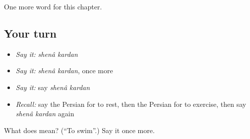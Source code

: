 \begin{grammarlens}[title={What you've built}]
One more word for this chapter.
\end{grammarlens}

\subsection*{Your turn}
\begin{itemize}
\raggedright
  \item \emph{Say it:} \emph{shenâ kardan}
  \item \emph{Say it:} \emph{shenâ kardan}, once more
  \item \emph{Say it:} say \emph{shenâ kardan}
  \item \emph{Recall:} say the Persian for to rest, then the Persian for to exercise, then say \emph{shenâ kardan} again
\end{itemize}

\begin{tcolorbox}[breakable,colback=teal!4,colframe=teal!35!black,title={Before you move on}]
What does   mean? (\textquotedblleft{}To swim\textquotedblright{}.) Say it once more.
\end{tcolorbox}
